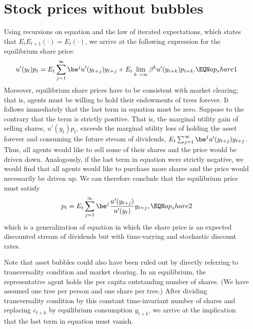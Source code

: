 \section{Stock prices without bubbles}

Using recursions on equation
  and the law of iterated expectations,
which states that $E_tE_{t+1}(\cdot) =E_t(\cdot)$,
we arrive at the following expression for the equilibrium share price:
$$
u'(y_t) p_t = E_t \sum_{j=1}^\infty \be^j u'(y_{t+j}) y_{t+j}
            + E_t \lim_{k\to\infty} \beta^k u'(y_{t+k})p_{t+k}.  \EQN ap_share1
$$
Moreover, equilibrium share prices have to be consistent with
market clearing; that is, agents must be willing to hold their endowments
of trees forever. It follows immediately that the last term in equation
 must be zero. Suppose to the contrary that the term is strictly
positive. That is, the marginal utility gain of selling shares, $u'(y_t) p_t$,
exceeds the marginal utility loss of
holding the asset forever and consuming the future stream of dividends,
$E_t \sum_{j=1}^\infty \be^j u'(y_{t+j}) y_{t+j}$. Thus, all agents
would like to sell some of their shares and the price would be driven
down. Analogously, if the last term in equation
  were strictly negative,
we would find that all agents would like to purchase more shares and the
price would necessarily be driven up. We can therefore conclude that the
equilibrium price must satisfy
$$
p_t = E_t \sum_{j=1}^\infty \be^j {u'(y_{t+j})\over u'(y_t)} y_{t+j},
                                                                  \EQN ap_share2
$$
which is a generalization of equation
  in which the share price is an expected
discounted stream of dividends but with time-varying and stochastic discount
rates.

Note that asset bubbles could also have been ruled out by directly
referring to transversality condition  and market clearing. In an
equilibrium, the representative agent holds the per capita
outstanding number of shares.
 (We have assumed one tree per person and one share per tree.)
After dividing transversality condition  by this constant
time-invariant number of shares and replacing $c_{t+k}$ by equilibrium
consumption $y_{t+k}$, we arrive at the implication that the last
term in equation
 must vanish.
       
   

